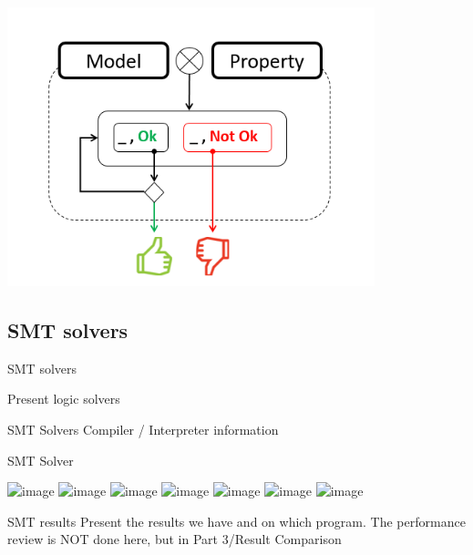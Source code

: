 \documentclass{beamer}
\begin{document}
\begin{frame}
\frametitle{}

\includegraphics[width=0.8\textwidth]{Figures/Model-checking.png}



\end{frame}


\subsection{SMT solvers}

\begin{frame}{SMT solvers}

Present logic solvers

\end{frame}

\begin{frame}{SMT Solvers}
Compiler / Interpreter information
\end{frame}

\begin{frame}{SMT Solver}

\includegraphics<1>[width=9cm]{Figures/SMTsolver/1.png}
\includegraphics<2>[width=9cm]{Figures/SMTsolver/2.png}
\includegraphics<3>[width=9cm]{Figures/SMTsolver/3.png}
\includegraphics<4>[width=9cm]{Figures/SMTsolver/4.png}
\includegraphics<5>[width=9cm]{Figures/SMTsolver/5.png}
\includegraphics<6>[width=9cm]{Figures/SMTsolver/6.png}
\includegraphics<7>[width=9cm]{Figures/SMTsolver/7.png}

\end{frame}

\begin{frame}{SMT results}
Present the results we have and on which program. The performance review is NOT done here, but in Part 3/Result Comparison
\end{frame}
\end{document}
